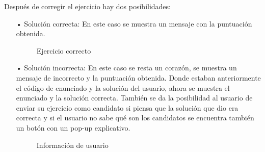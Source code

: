 Después de corregir el ejercicio hay dos posibilidades:
\begin{itemize}
\item[•]Solución correcta: En este caso se muestra un mensaje con la puntuación obtenida.

\begin{figure}[H]
\begin{center}
\caption{Ejercicio correcto\label{fig:correcto}}
\end{center}
\end{figure}

\item[•]Solución incorrecta: En este caso se resta un corazón, se muestra un mensaje de incorrecto y la puntuación obtenida. Donde estaban anteriormente el código de enunciado y la solución del usuario, ahora se muestra el enunciado y la solución correcta. También se da la posibilidad al usuario de enviar su ejercicio como candidato si piensa que la solución que dio era correcta y si el usuario no sabe qué son los candidatos se encuentra también un botón con un pop-up explicativo.

\begin{figure}[H]
\begin{center}
\caption{Información de usuario\label{fig:usuario}}
\end{center}
\end{figure}


\end{itemize}
